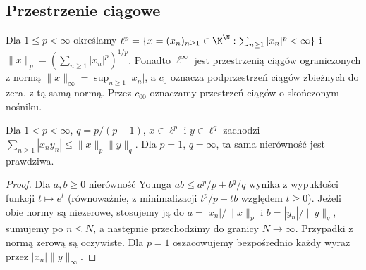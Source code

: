 \subsection{Przestrzenie ciągowe}

\begin{definicja}
\label{def:sequence-spaces12}
Dla $1\le p<\infty$ określamy
$\ell^p=\{x=(x_n)_{n\ge1}\in\K^{\N}:\sum_{n\ge1}|x_n|^p<\infty\}$
i $\|x\|_p=(\sum_{n\ge1}|x_n|^p)^{1/p}$.
Ponadto $\ell^\infty$ jest przestrzenią ciągów ograniczonych
z normą $\|x\|_\infty=\sup_{n\ge1}|x_n|$, a $c_0$ oznacza
podprzestrzeń ciągów zbieżnych do zera, z tą samą normą.
Przez $c_{00}$ oznaczamy przestrzeń ciągów o skończonym nośniku.
\end{definicja}

\begin{lemat}
\label{lem:holder-seq12}
Dla $1<p<\infty$, $q=p/(p-1)$, $x\in\ell^p$ i $y\in\ell^q$
zachodzi
$\sum_{n\ge1}|x_ny_n|\le\|x\|_p\|y\|_q$.
Dla $p=1$, $q=\infty$, ta sama nierówność jest prawdziwa.
\end{lemat}
\begin{proof}
Dla $a,b\ge0$ nierówność Younga
$ab\le a^p/p+b^q/q$ wynika z wypukłości funkcji
$t\mapsto e^t$ (równoważnie, z minimalizacji
$t^p/p-tb$ względem $t\ge0$). Jeżeli obie normy są niezerowe,
stosujemy ją do $a=|x_n|/\|x\|_p$ i
$b=|y_n|/\|y\|_q$, sumujemy po $n\le N$,
a następnie przechodzimy do granicy $N\to\infty$.
Przypadki z normą zerową są oczywiste. Dla $p=1$
oszacowujemy bezpośrednio każdy wyraz przez
$|x_n|\|y\|_\infty$.
\end{proof}

